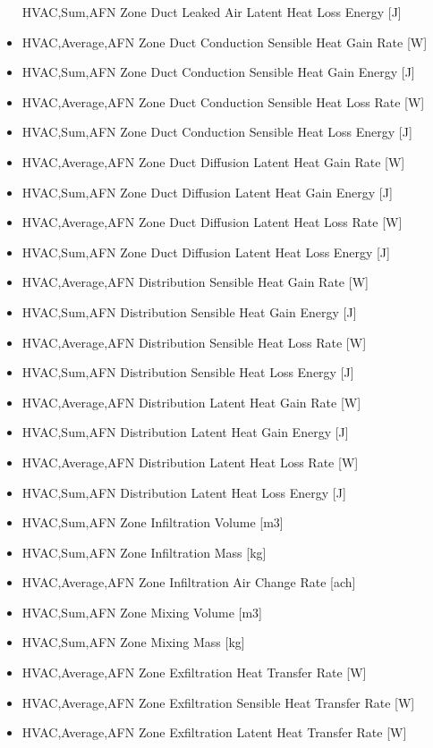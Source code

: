 \begin{itemize}
  HVAC,Sum,AFN Zone Duct Leaked Air Latent Heat Loss Energy {[}J{]}
\item
  HVAC,Average,AFN Zone Duct Conduction Sensible Heat Gain Rate {[}W{]}
\item
  HVAC,Sum,AFN Zone Duct Conduction Sensible Heat Gain Energy {[}J{]}
\item
  HVAC,Average,AFN Zone Duct Conduction Sensible Heat Loss Rate {[}W{]}
\item
  HVAC,Sum,AFN Zone Duct Conduction Sensible Heat Loss Energy {[}J{]}
\item
  HVAC,Average,AFN Zone Duct Diffusion Latent Heat Gain Rate {[}W{]}
\item
  HVAC,Sum,AFN Zone Duct Diffusion Latent Heat Gain Energy {[}J{]}
\item
  HVAC,Average,AFN Zone Duct Diffusion Latent Heat Loss Rate {[}W{]}
\item
  HVAC,Sum,AFN Zone Duct Diffusion Latent Heat Loss Energy {[}J{]}
\item
  HVAC,Average,AFN Distribution Sensible Heat Gain Rate {[}W{]}
\item
  HVAC,Sum,AFN Distribution Sensible Heat Gain Energy {[}J{]}
\item
  HVAC,Average,AFN Distribution Sensible Heat Loss Rate {[}W{]}
\item
  HVAC,Sum,AFN Distribution Sensible Heat Loss Energy {[}J{]}
\item
  HVAC,Average,AFN Distribution Latent Heat Gain Rate {[}W{]}
\item
  HVAC,Sum,AFN Distribution Latent Heat Gain Energy {[}J{]}
\item
  HVAC,Average,AFN Distribution Latent Heat Loss Rate {[}W{]}
\item
  HVAC,Sum,AFN Distribution Latent Heat Loss Energy {[}J{]}
\item
  HVAC,Sum,AFN Zone Infiltration Volume {[}m3{]}
\item
  HVAC,Sum,AFN Zone Infiltration Mass {[}kg{]}
\item
  HVAC,Average,AFN Zone Infiltration Air Change Rate {[}ach{]}
\item
  HVAC,Sum,AFN Zone Mixing Volume {[}m3{]}
\item
  HVAC,Sum,AFN Zone Mixing Mass {[}kg{]}
\item
  HVAC,Average,AFN Zone Exfiltration Heat Transfer Rate {[}W{]}
\item
  HVAC,Average,AFN Zone Exfiltration Sensible Heat Transfer Rate {[}W{]}
\item
  HVAC,Average,AFN Zone Exfiltration Latent Heat Transfer Rate {[}W{]}
\end{itemize}

